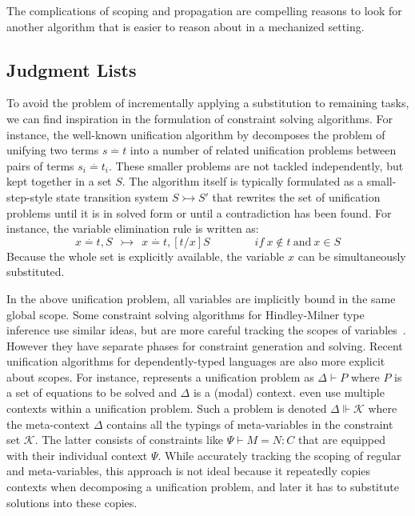 The complications of scoping and propagation are compelling reasons
to look for another algorithm that is easier to
reason about in a mechanized setting.


\subsection{Judgment Lists}\label{sec:overview:list}
To avoid the problem of incrementally applying a substitution to remaining
tasks, we can find inspiration in the formulation of constraint solving
algorithms. For instance, the well-known unification
algorithm by \citet{unification} decomposes the problem of unifying two terms $s \stackrel{.}{=} t$ into a number
of related unification problems between pairs of terms $s_i \stackrel{.}{=} t_i$. These smaller
problems are not tackled independently, but kept together in a set $S$. 
The algorithm itself is typically formulated as a small-step-style state
transition system $S \rightarrowtail S'$ that rewrites the set of unification
problems until it is in solved form or until a contradiction has been found.
For instance, the variable elimination rule is written as:
\[
   x \stackrel{.}{=} t, S  ~~\rightarrowtail~~  x \stackrel{.}{=} t, [t/x]S   \qquad\qquad{if}~x \not\in t~\text{and}~{x \in S}
\]
Because the whole set is explicitly available, the variable $x$ can be
simultaneously substituted.

In the above unification problem, all variables are implicitly bound in the same
global scope. 
Some constraint solving algorithms for Hindley-Milner type
  inference use similar ideas, but are more careful tracking the
  scopes of variables~\citep{remy-attapl}. However they have separate phases for 
constraint generation and solving.
Recent unification algorithms for dependently-typed languages
are also more explicit about scopes. For instance, \citet{Reed2009} represents a unification
problem as $\Delta \vdash P$ where $P$ is a set of equations to be solved and $\Delta$ is
a (modal) context. \citet{Abel2011higher} even use multiple contexts within a unification problem.
Such a problem is denoted $\Delta \Vdash \mathcal{K}$ where the meta-context
$\Delta$ contains all the typings of meta-variables in the constraint set
$\mathcal{K}$. The latter consists of constraints like $\Psi \vdash M = N : C$
that are equipped with their individual context $\Psi$. While accurately tracking
the scoping of regular and meta-variables, this approach is not ideal because it
repeatedly copies contexts when decomposing a unification problem, and
later it has to 
substitute solutions into these copies.

